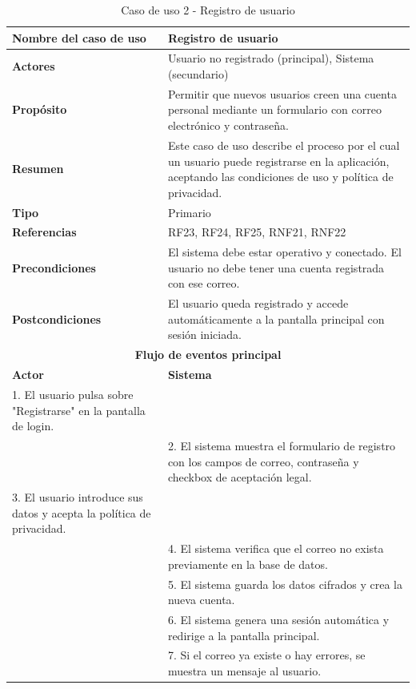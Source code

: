 \begin{table}[H]
\centering
\caption{Caso de uso 2 - Registro de usuario}
\begin{tabular}{|p{4.5cm}|p{10.5cm}|}
\hline
\textbf{Nombre del caso de uso} & Registro de usuario \\
\hline
\textbf{Actores} & Usuario no registrado (principal), Sistema (secundario) \\
\hline
\textbf{Propósito} & Permitir que nuevos usuarios creen una cuenta personal mediante un formulario con correo electrónico y contraseña. \\
\hline
\textbf{Resumen} & Este caso de uso describe el proceso por el cual un usuario puede registrarse en la aplicación, aceptando las condiciones de uso y política de privacidad. \\
\hline
\textbf{Tipo} & Primario \\
\hline
\textbf{Referencias} & RF23, RF24, RF25, RNF21, RNF22 \\
\hline
\textbf{Precondiciones} & El sistema debe estar operativo y conectado. El usuario no debe tener una cuenta registrada con ese correo. \\
\hline
\textbf{Postcondiciones} & El usuario queda registrado y accede automáticamente a la pantalla principal con sesión iniciada. \\
\hline
\multicolumn{2}{|c|}{\textbf{Flujo de eventos principal}} \\
\hline
\textbf{Actor} & \textbf{Sistema} \\
\hline
1. El usuario pulsa sobre "Registrarse" en la pantalla de login. & \\
\hline
& 2. El sistema muestra el formulario de registro con los campos de correo, contraseña y checkbox de aceptación legal. \\
\hline
3. El usuario introduce sus datos y acepta la política de privacidad. & \\
\hline
& 4. El sistema verifica que el correo no exista previamente en la base de datos. \\
\hline
& 5. El sistema guarda los datos cifrados y crea la nueva cuenta. \\
\hline
& 6. El sistema genera una sesión automática y redirige a la pantalla principal. \\
\hline
& 7. Si el correo ya existe o hay errores, se muestra un mensaje al usuario. \\
\hline
\end{tabular}
\end{table}

